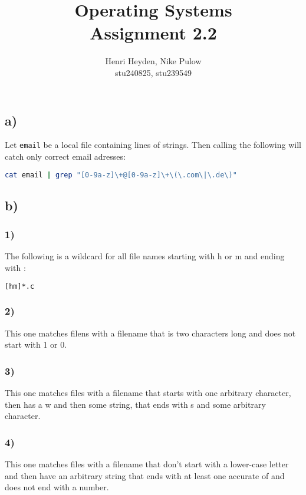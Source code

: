 \documentclass[12pt, a4paper]{article}
\title{Operating Systems\\Assignment 2.2}
\author{Henri Heyden, Nike Pulow \\ \small stu240825, stu239549}
\date{}
\begin{document}
\maketitle

\singlespacing
\subsection*{a)}
Let \verb|email| be a local file containing lines of strings. Then calling the following will catch only correct email adresses:
\begin{lstlisting}[language=sh]
cat email | grep "[0-9a-z]\+@[0-9a-z]\+\(\.com\|\.de\)"
\end{lstlisting}
\subsection*{b)}
\subsubsection*{1)}
The following is a wildcard for all file names starting with \say h or \say m and ending with :
\vspace*{-0.65cm}
\begin{lstlisting}[language=sh]
               [hm]*.c
\end{lstlisting}
\subsubsection*{2)}
This one matches filens with a filename that is two characters long and does not start with 1 or 0.
\subsubsection*{3)}
This one matches files with a filename that starts with one arbitrary character, then has a \say w and then some string, that ends with \say s and some arbitrary character.
\subsubsection*{4)}
This one matches files with a filename that don't start with a lower-case letter and then have an arbitrary string that ends with at least one accurate of  and does not end with a number.
\end{document}
